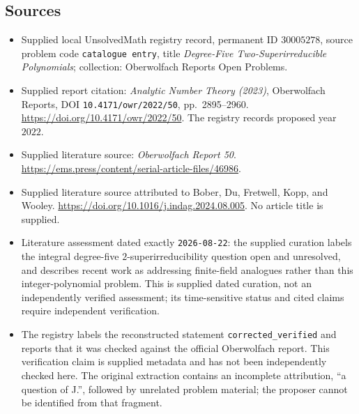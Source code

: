 \documentclass[11pt]{article}
\begin{document}
\subsection{Sources}
\begin{itemize}
\item Supplied local UnsolvedMath registry record, permanent ID \(30005278\), source problem code \texttt{catalogue entry}, title \emph{Degree-Five Two-Superirreducible Polynomials}; collection: Oberwolfach Reports Open Problems.
\item Supplied report citation: \emph{Analytic Number Theory (2023)}, Oberwolfach Reports, DOI \texttt{10.4171/owr/2022/50}, pp.~2895--2960. \url{https://doi.org/10.4171/owr/2022/50}. The registry records proposed year \(2022\).
\item Supplied literature source: \emph{Oberwolfach Report 50}. \url{https://ems.press/content/serial-article-files/46986}.
\item Supplied literature source attributed to Bober, Du, Fretwell, Kopp, and Wooley. \url{https://doi.org/10.1016/j.indag.2024.08.005}. No article title is supplied.
\item Literature assessment dated exactly \texttt{2026-08-22}: the supplied curation labels the integral degree-five \(2\)-superirreducibility question open and unresolved, and describes recent work as addressing finite-field analogues rather than this integer-polynomial problem. This is supplied dated curation, not an independently verified assessment; its time-sensitive status and cited claims require independent verification.
\item The registry labels the reconstructed statement \texttt{corrected\_verified} and reports that it was checked against the official Oberwolfach report. This verification claim is supplied metadata and has not been independently checked here. The original extraction contains an incomplete attribution, ``a question of J.'', followed by unrelated problem material; the proposer cannot be identified from that fragment.
\end{itemize}
\end{document}
